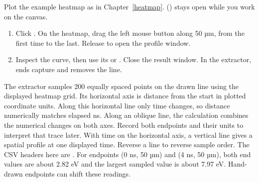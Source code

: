 
Plot the example heatmap as in Chapter~\ref{heatmap}.  () stays open while you work on the canvas.
\begin{enumerate}
\item Click . On the heatmap, drag the left mouse button along 50 µm, from the first time to the last. Release to open the profile window.
\item Inspect the curve, then use its  or . Close the result window. In the extractor,  ends capture and  removes the line.
\end{enumerate}
The extractor samples 200 equally spaced points on the drawn line using the displayed heatmap grid. Its horizontal axis is distance from the start in plotted coordinate units. Along this horizontal line only time changes, so distance numerically matches elapsed ns. Along an oblique line, the calculation combines the numerical changes on both axes. Record both endpoints and their units to interpret that trace later.
With time on the horizontal axis, a vertical line gives a spatial profile at one displayed time. Reverse a line to reverse sample order. The CSV headers here are . For endpoints (0 ns, 50 µm) and (4 ns, 50 µm), both end values are about 2.82 eV and the largest sampled value is about 7.97 eV. Hand-drawn endpoints can shift these readings.

